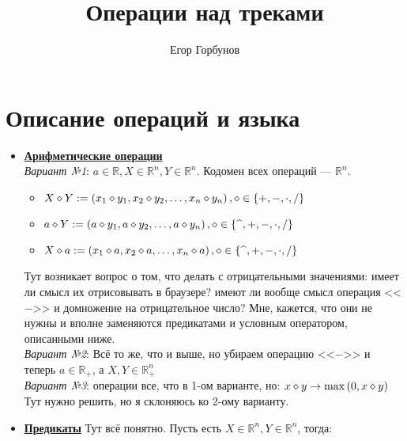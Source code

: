 

\newcommand{\kw}[1]{\text{\textbf{\color{blue}{#1}}}}

\title{Операции над треками}
\author{Егор Горбунов}


\maketitle

\section*{Описание операций и языка}
\begin{itemize}
	\item \textbf{\underline{Арифметические операции}} 
	\vspace{3pt}
	\\\emph{Вариант №1}: $a \in \mathbb{R}, X \in \mathbb{R}^n, Y \in \mathbb{R}^n$. Кодомен всех операций --- $\mathbb{R}^n$.
		\begin{itemize}
			\item $X \diamond Y := \left( x_1 \diamond y_1, x_2 \diamond y_2, \ldots, x_n \diamond y_n \right), \diamond \in \left\lbrace +, -, \cdot, / \right\rbrace$
			\item $a \diamond Y := \left( a \diamond y_1, a \diamond y_2, \ldots, a \diamond y_n \right), \diamond \in \left\lbrace \text{\textasciicircum}, +, -, \cdot, / \right\rbrace$
			\item $X \diamond a := \left( x_1 \diamond a, x_2 \diamond a, \ldots, x_n \diamond a \right), \diamond \in \left\lbrace \text{\textasciicircum}, +, -, \cdot, / \right\rbrace$
		\end{itemize}
	Тут возникает вопрос о том, что делать с отрицательными значениями: имеет ли смысл их отрисовывать в браузере? имеют ли вообще смысл операция <<$-$>> и домножение на отрицательное число? Мне, кажется, что они не нужны и вполне заменяются предикатами и условным оператором, описанными ниже.
	\vspace{3pt}
	\\\emph{Вариант №2}: Всё то же, что и выше, но убираем операцию <<$-$>> и теперь $a \in \mathbb{R}_+$, а $X, Y \in \mathbb{R}_+^n$
	\\\emph{Вариант №3}: операции все, что в 1-ом варианте, но: $x \diamond y \rightarrow \max{\left( 0, x \diamond y \right)}$
	\vspace{5pt}
	\\Тут нужно решить, но я склоняюсь ко 2-ому варианту.
	\item \textbf{\underline{Предикаты}} Тут всё понятно. Пусть есть $X \in \mathbb{R}^n, Y \in \mathbb{R}^n$, тогда:

\end{itemize}
